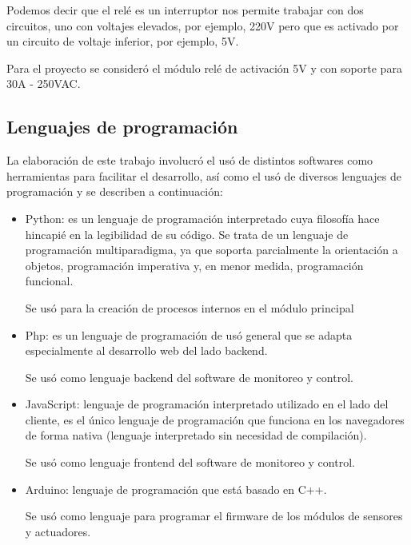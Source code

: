 Podemos decir que el relé es un interruptor nos permite trabajar con dos circuitos, uno con voltajes elevados, por ejemplo, 220V pero que es activado por un circuito de voltaje inferior, por ejemplo, 5V.

Para el proyecto se consideró el módulo relé de activación 5V y con soporte para 30A - 250VAC.

\subsection{Lenguajes de programación}

La elaboración de este trabajo involucró el usó de distintos softwares como herramientas para facilitar el desarrollo, así como el usó de diversos lenguajes de programación y se describen a continuación:
\begin{itemize}
\item Python: es un lenguaje de programación interpretado cuya filosofía hace hincapié en la legibilidad de su código. Se trata de un lenguaje de programación multiparadigma, ya que soporta parcialmente la orientación a objetos, programación imperativa y, en menor medida, programación funcional.

Se usó para la creación de procesos internos en el módulo principal 
\item Php: es un lenguaje de programación de usó general que se adapta especialmente al desarrollo web del lado backend.

Se usó como lenguaje backend del software de monitoreo y control.
\item JavaScript: lenguaje de programación interpretado utilizado en el lado del cliente, es el único lenguaje de programación que funciona en los navegadores de forma nativa (lenguaje interpretado sin necesidad de compilación).

Se usó como lenguaje frontend del software de monitoreo y control.
\item Arduino: lenguaje de programación que está basado en C++.

Se usó como lenguaje para programar el firmware de los módulos de sensores y actuadores.
\end{itemize}